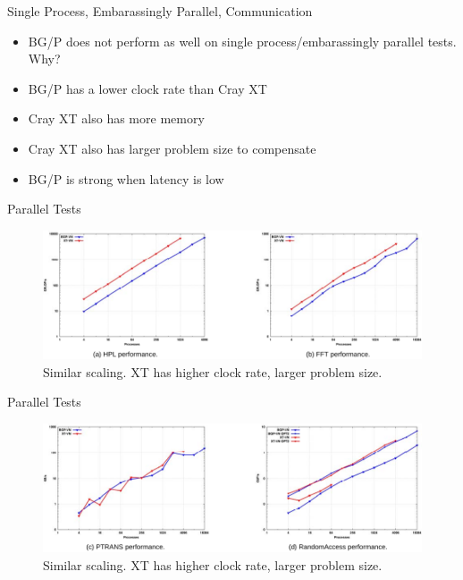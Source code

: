 \documentclass{beamer}
\begin{document}
\begin{frame}{Single Process, Embarassingly Parallel, Communication}
\begin{itemize}
\item BG/P does not perform as well on single process/embarassingly parallel
tests. Why?
\item BG/P has a lower clock rate than Cray XT
\item Cray XT also has more memory
\item Cray XT also has larger problem size to compensate
\item BG/P is strong when latency is low
\end{itemize}
\end{frame}

\begin{frame}{Parallel Tests}
\begin{figure}
\includegraphics[scale=0.45]{figs/parallel1.png}
\caption{Similar scaling. XT has higher clock rate, larger problem size.}
\end{figure}
\end{frame}

\begin{frame}{Parallel Tests}
\begin{figure}
\includegraphics[scale=0.45]{figs/parallel2.png}
\caption{Similar scaling. XT has higher clock rate, larger problem size.}
\end{figure}
\end{frame}
\end{document}
